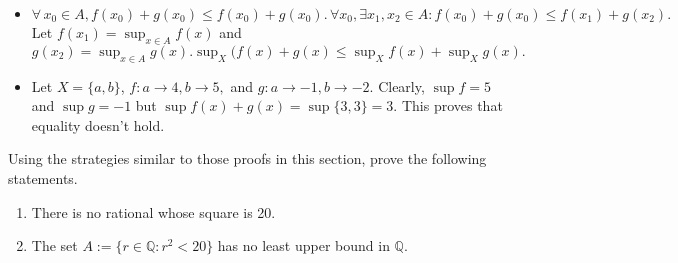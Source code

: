 \documentclass[12pt,letterpaper,boxed]{hmcpset}
\begin{document}
\begin{solution}
\begin{itemize}
	\itemsep0em
	\item $\forall \, x_0 \in A, f(x_0) + g(x_0) \leq f(x_0) + g(x_0). \,\forall x_0, \exists x_1, x_2 \in A : f(x_0) + g(x_0) \leq f(x_1) + g(x_2).$ Let $f(x_1) = \sup_{x \in A} f(x)$ and $g(x_2) = \sup_{x \in A} g(x). \sup_{X} (f(x) + g(x) \leq \sup_{X} f(x) + \sup_{X} g(x).$ 
	\item Let $X=\{a,b\}$, $f : a \rightarrow 4, b \rightarrow 5,$ and $g : a \rightarrow -1, b \rightarrow -2.$ Clearly, $\sup f=5$ and $\sup g = -1$ but $\sup f(x) + g(x) = \sup \{3,3\}=3.$ This proves that equality doesn't hold.
\end{itemize}

\end{solution}

\begin{problem}[Exercise 3.3.]
Using the strategies similar to those proofs in this section, prove the following statements.
\vspace{-2mm}
\begin{enumerate}
	\itemsep0em
	\item There is no rational whose square is 20.
	\item The set $A := \{r \in \mathbb{Q} : r^2 < 20\}$ has no least upper bound in $\mathbb{Q}$. 
\end{enumerate}
\end{problem}
\end{document}
